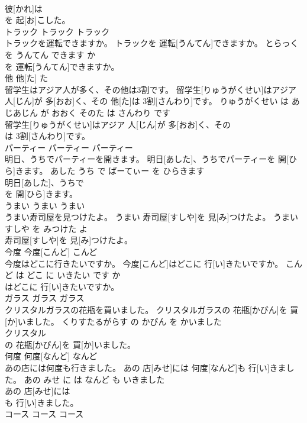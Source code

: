 \documentclass[8pt]{extreport}
\begin{document}
\begin{CJK}{UTF8}{min}
\\	彼[かれ]は
\\	を 起[お]こした。			
\\	トラック	トラック	トラック	
\\	トラックを運転できますか。	トラックを 運転[うんてん]できますか。	とらっく を うんてん できます か	
\\	を 運転[うんてん]できますか。			
\\	他	他[た]	た	
\\	留学生はアジア人が多く、その他は3割です。	留学生[りゅうがくせい]はアジア 人[じん]が 多[おお]く、その 他[た]は 3割[さんわり]です。	りゅうがくせい は あじあじん が おおく そのた は さんわり です	
\\	留学生[りゅうがくせい]はアジア 人[じん]が 多[おお]く、その
\\	は 3割[さんわり]です。			
\\	パーティー	パーティー	パーティー	
\\	明日、うちでパーティーを開きます。	明日[あした]、うちでパーティーを 開[ひら]きます。	あした うち で ぱーてぃー を ひらきます	
\\	明日[あした]、うちで
\\	を 開[ひら]きます。			
\\	うまい	うまい	うまい	
\\	うまい寿司屋を見つけたよ。	うまい 寿司屋[すしや]を 見[み]つけたよ。	うまい すしや を みつけた よ	
\\	寿司屋[すしや]を 見[み]つけたよ。			
\\	今度	今度[こんど]	こんど	
\\	今度はどこに行きたいですか。	今度[こんど]はどこに 行[い]きたいですか。	こんど は どこ に いきたい です か	
\\	はどこに 行[い]きたいですか。			
\\	ガラス	ガラス	ガラス	
\\	クリスタルガラスの花瓶を買いました。	クリスタルガラスの 花瓶[かびん]を 買[か]いました。	くりすたるがらす の かびん を かいました	
\\	クリスタル
\\	の 花瓶[かびん]を 買[か]いました。			
\\	何度	何度[なんど]	なんど	
\\	あの店には何度も行きました。	あの 店[みせ]には 何度[なんど]も 行[い]きました。	あの みせ に は なんど も いきました	
\\	あの 店[みせ]には
\\	も 行[い]きました。			
\\	コース	コース	コース	

\end{CJK}
\end{document}
